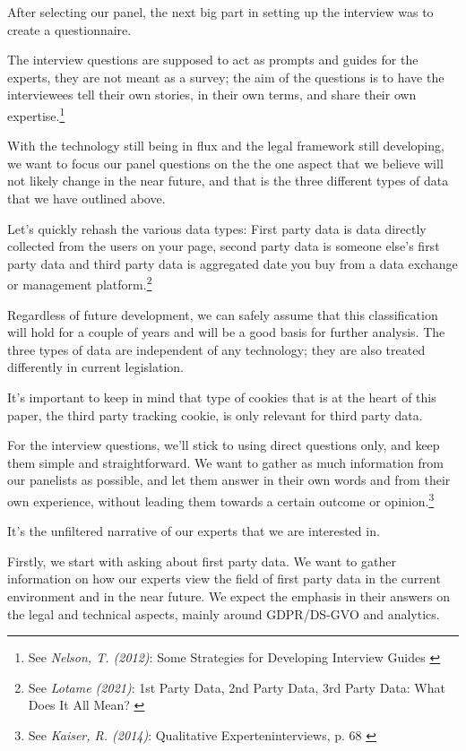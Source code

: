 After selecting our panel, the next big part in setting up the interview was to create a questionnaire.

The interview questions are supposed to act as prompts and guides for the experts, they are not meant as a survey; the aim of the questions is to have the interviewees tell their own stories, in their own terms, and share their own expertise.\footnote{See \textit{Nelson, T. (2012)}: Some Strategies for Developing Interview Guides \cite{qualiStrategies}}

With the technology still being in flux and the legal framework still developing, we want to focus our panel questions on the the one aspect that we believe will not likely change in the near future, and that is the three different types of data that we have outlined above.

Let's quickly rehash the various data types: First party data is data directly collected from the users on your page, second party data is someone else's first party data and third party data is aggregated date you buy from a data exchange or management platform.\footnote{See \textit{Lotame (2021)}: 1st Party Data, 2nd Party Data, 3rd Party Data: What Does It All Mean? \cite{lotameRehash}}

Regardless of future development, we can safely assume that this classification will hold for a couple of years and will be a good basis for further analysis. The three types of data are independent of any technology; they are also treated differently in current legislation.

It's important to keep in mind that type of cookies that is at the heart of this paper, the third party tracking cookie, is only relevant for third party data.

For the interview questions, we'll stick to using direct questions only, and keep them simple and straightforward. We want to gather as much information from our panelists as possible, and let them answer in their own words and from their own experience, without leading them towards a certain outcome or opinion.\footnote{See \textit{Kaiser, R. (2014)}: Qualitative Experteninterviews, p. 68 \cite{expertInterviews}} 

It's the unfiltered narrative of our experts that we are interested in.

Firstly, we start with asking about first party data. We want to gather information on how our experts view the field of first party data in the current environment and in the near future. We expect the emphasis in their answers on the legal and technical aspects, mainly around GDPR/DS-GVO and analytics.

